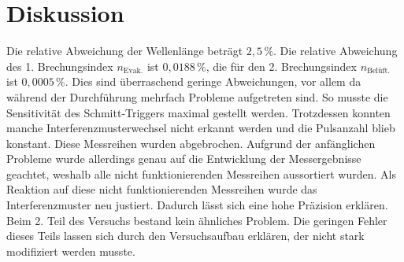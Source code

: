 \section{Diskussion}
\label{sec:Diskussion}
Die relative Abweichung der Wellenlänge beträgt $2,5 \, \%$. Die relative Abweichung des 1. Brechungsindex $n_{\text{Evak.}}$ ist $0,0188 \, \%$, die für den 2. 
Brechungsindex $n_{\text{Belüft.}}$ ist $0,0005 \, \%$. Dies sind überraschend geringe Abweichungen, vor allem da während der Durchführung mehrfach
 Probleme aufgetreten sind. So musste die Sensitivität des Schmitt-Triggers maximal gestellt werden. Trotzdessen konnten manche Interferenzmusterwechsel 
 nicht erkannt werden und die Pulsanzahl blieb konstant. Diese Messreihen wurden abgebrochen. 
 Aufgrund der anfänglichen Probleme wurde allerdings genau auf die Entwicklung der Messergebnisse geachtet, weshalb alle nicht funktionierenden Messreihen 
 aussortiert wurden. Als Reaktion auf diese nicht funktionierenden Messreihen wurde das Interferenzmuster neu justiert. Dadurch lässt sich eine hohe Präzision 
 erklären. Beim 2. Teil des Versuchs bestand kein ähnliches Problem. Die geringen Fehler dieses Teils lassen sich durch den Versuchsaufbau erklären, 
 der nicht stark modifiziert werden musste.